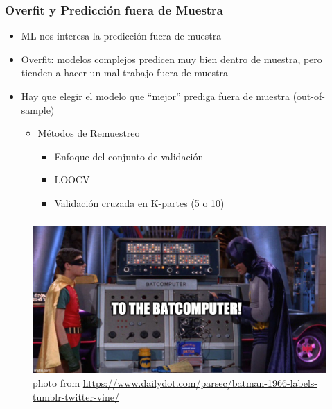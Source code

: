 \documentclass[
  shownotes,
  xcolor={svgnames},
  hyperref={colorlinks,citecolor=DarkBlue,linkcolor=andesred,urlcolor=DarkBlue}
  , aspectratio=169]{beamer}
\begin{document}
\begin{frame}
\frametitle{Overfit y Predicción fuera de Muestra}


\begin{itemize}
  \item ML nos interesa la predicción fuera de muestra
  \medskip
  \item Overfit: modelos complejos predicen muy bien dentro de muestra, pero tienden a hacer un mal trabajo fuera de muestra 
  \medskip
  \item Hay que elegir el modelo que ``mejor'' prediga fuera de muestra (out-of-sample)
  \medskip

    \begin{itemize}
    \medskip
    \item Métodos de Remuestreo
    \medskip
      \begin{itemize}

        \item Enfoque del conjunto de validación
        \medskip
        \item LOOCV
        \medskip
        \item Validación cruzada en K-partes (5 o 10)
      \end{itemize}
    \end{itemize}

\end{itemize}

\end{frame}
\begin{frame}[fragile]
\frametitle{}
\begin{figure}[H] \centering
  \centering
  \includegraphics[scale=0.35]{figures/baticomputer_meme.jpg}
  \\
  \tiny photo from \url{https://www.dailydot.com/parsec/batman-1966-labels-tumblr-twitter-vine/}
\end{figure}

 \end{frame}
\end{document}

